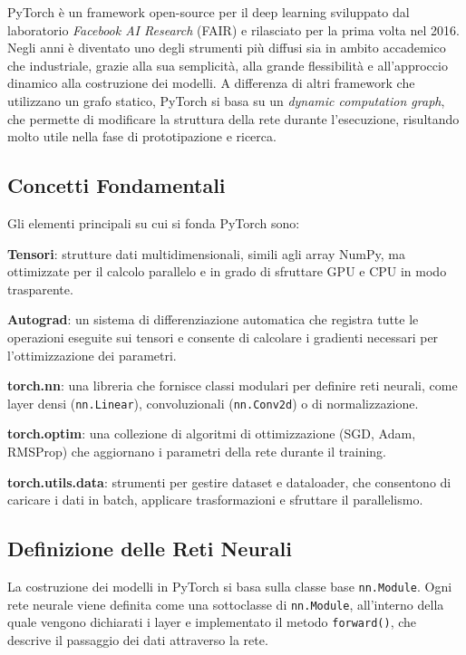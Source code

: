 PyTorch è un framework open-source per il deep learning sviluppato dal laboratorio \textit{Facebook AI Research} (FAIR) e rilasciato per la prima volta nel 2016. Negli anni è diventato uno degli strumenti più diffusi sia in ambito accademico che industriale, grazie alla sua semplicità, alla grande flessibilità e all'approccio dinamico alla costruzione dei modelli. A differenza di altri framework che utilizzano un grafo statico, PyTorch si basa su un \textit{dynamic computation graph}, che permette di modificare la struttura della rete durante l'esecuzione, risultando molto utile nella fase di prototipazione e ricerca.

\subsection{Concetti Fondamentali}
Gli elementi principali su cui si fonda PyTorch sono:
\begin{compactitemize}
    \item \textbf{Tensori}: strutture dati multidimensionali, simili agli array NumPy, ma ottimizzate per il calcolo parallelo e in grado di sfruttare GPU e CPU in modo trasparente.
    \item \textbf{Autograd}: un sistema di differenziazione automatica che registra tutte le operazioni eseguite sui tensori e consente di calcolare i gradienti necessari per l'ottimizzazione dei parametri.
    \item \textbf{torch.nn}: una libreria che fornisce classi modulari per definire reti neurali, come layer densi (\texttt{nn.Linear}), convoluzionali (\texttt{nn.Conv2d}) o di normalizzazione.
    \item \textbf{torch.optim}: una collezione di algoritmi di ottimizzazione (SGD, Adam, RMSProp) che aggiornano i parametri della rete durante il training.
    \item \textbf{torch.utils.data}: strumenti per gestire dataset e dataloader, che consentono di caricare i dati in batch, applicare trasformazioni e sfruttare il parallelismo.
\end{compactitemize}

\subsection{Definizione delle Reti Neurali}
La costruzione dei modelli in PyTorch si basa sulla classe base \texttt{nn.Module}. Ogni rete neurale viene definita come una sottoclasse di \texttt{nn.Module}, all'interno della quale vengono dichiarati i layer e implementato il metodo \texttt{forward()}, che descrive il passaggio dei dati attraverso la rete.

